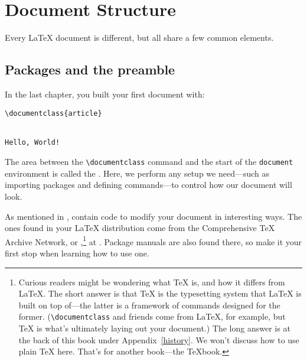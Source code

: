\chapter{Document Structure}
\label{structure}

Every \LaTeX{} document is different,
but all share a few common elements.

\section{Packages and the preamble}
In the last chapter, you built your first document with:
\begin{leftfigure}
\begin{lstlisting}
\documentclass{article}


Hello, World!

\end{lstlisting}
\end{leftfigure}
The area between the \verb|\documentclass| command and the start of the
\texttt{document} environment is called the .
Here, we perform any setup we need---such as importing packages
and defining commands---to control how our document
will look.

As mentioned in ,
 contain code to modify your document in interesting ways.
The ones found in your \LaTeX{} distribution come from the Comprehensive \TeX{}
Archive Network, or ,\punckern\footnote{Curious readers might
be wondering what \TeX{} is, and how it differs from \LaTeX.
The short answer is that \TeX{} is the typesetting system that \LaTeX{}
is built on top of---the latter is a framework of commands designed for the former.
(\texttt{\textbackslash documentclass} and friends come from
\LaTeX{}, for example, but \TeX{} is what's ultimately laying out your document.)
The long answer is at the back of this book under Appendix~\ref{history}.
We won't discuss how to use plain \TeX{} here. That's for another book---the
\TeX book.}
at .
Package manuals are also found there,
so make it your first stop when learning how to use one.

